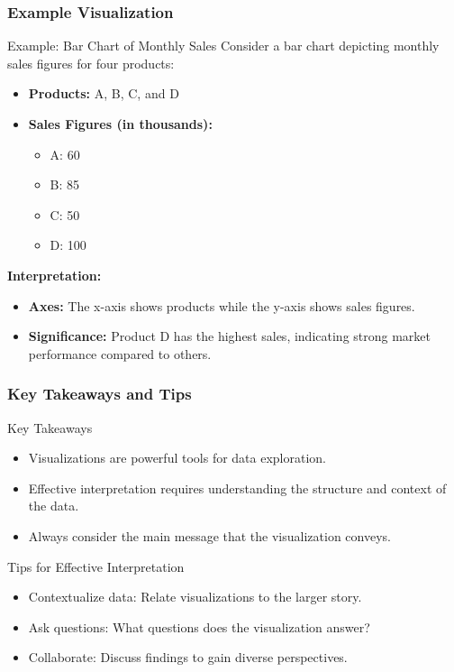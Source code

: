 \documentclass[aspectratio=169]{beamer}
\begin{document}
\begin{frame}[fragile]
    \frametitle{Example Visualization}
    \begin{block}{Example: Bar Chart of Monthly Sales}
        Consider a bar chart depicting monthly sales figures for four products:
        \begin{itemize}
            \item \textbf{Products:} A, B, C, and D
            \item \textbf{Sales Figures (in thousands):}
            \begin{itemize}
                \item A: 60
                \item B: 85
                \item C: 50
                \item D: 100
            \end{itemize}
        \end{itemize}
        
        \textbf{Interpretation:}
        \begin{itemize}
            \item \textbf{Axes:} The x-axis shows products while the y-axis shows sales figures.
            \item \textbf{Significance:} Product D has the highest sales, indicating strong market performance compared to others.
        \end{itemize}
    \end{block}
\end{frame}

\begin{frame}[fragile]
    \frametitle{Key Takeaways and Tips}
    \begin{block}{Key Takeaways}
        \begin{itemize}
            \item Visualizations are powerful tools for data exploration.
            \item Effective interpretation requires understanding the structure and context of the data.
            \item Always consider the main message that the visualization conveys.
        \end{itemize}
    \end{block}

    \begin{block}{Tips for Effective Interpretation}
        \begin{itemize}
            \item Contextualize data: Relate visualizations to the larger story.
            \item Ask questions: What questions does the visualization answer?
            \item Collaborate: Discuss findings to gain diverse perspectives.
        \end{itemize}
    \end{block}
\end{frame}
\end{document}
